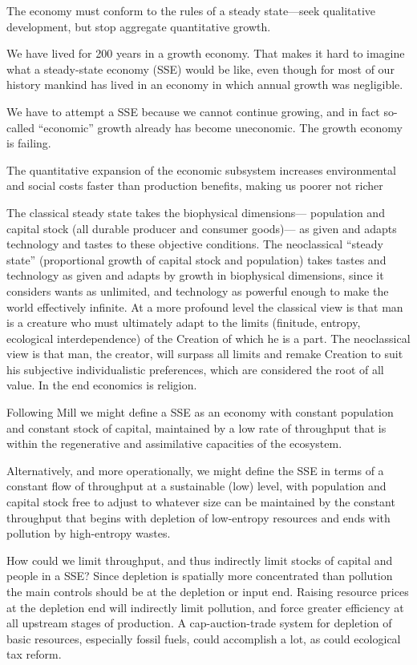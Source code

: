 \documentclass[
]{book}
\begin{document}
The economy must conform to the rules of a steady
state---seek qualitative development, but stop aggregate quantitative growth.

We have lived for 200 years in a growth economy. That makes it hard to imagine what a steady-state economy (SSE)
would be like, even though for most of our history mankind has lived in an economy in which annual growth was
negligible.

We have to attempt a SSE because we cannot continue growing, and in
fact so-called ``economic'' growth already has become uneconomic. The growth economy is failing.

The quantitative expansion of the economic subsystem increases environmental and social costs faster than production
benefits, making us poorer not richer

The classical steady state takes the biophysical dimensions--- population and capital stock (all durable producer and
consumer goods)--- as given and adapts technology and tastes to these objective conditions. The neoclassical ``steady
state'' (proportional growth of capital stock and population) takes tastes and technology as given and adapts by growth
in biophysical dimensions, since it considers wants as unlimited, and technology as powerful enough to make the
world effectively infinite. At a more profound level the classical view is that man is a creature who must ultimately
adapt to the limits (finitude, entropy, ecological interdependence) of the Creation of which he is a part. The
neoclassical view is that man, the creator, will surpass all limits and remake Creation to suit his subjective
individualistic preferences, which are considered the root of all value. In the end economics is religion.

Following Mill we might define a SSE as an economy with constant population and constant stock of capital,
maintained by a low rate of throughput that is within the regenerative and assimilative capacities of the ecosystem.

Alternatively, and more operationally, we might
define the SSE in terms of a constant flow of throughput at a sustainable (low) level, with population and capital stock
free to adjust to whatever size can be maintained by the constant throughput that begins with depletion of low-entropy
resources and ends with pollution by high-entropy wastes.

How could we limit throughput, and thus indirectly limit stocks of capital and people in a SSE? Since depletion is
spatially more concentrated than pollution the main controls should be at the depletion or input end. Raising resource
prices at the depletion end will indirectly limit pollution, and force greater efficiency at all upstream stages of
production. A cap-auction-trade system for depletion of basic resources, especially fossil fuels, could accomplish a
lot, as could ecological tax reform.
\end{document}
